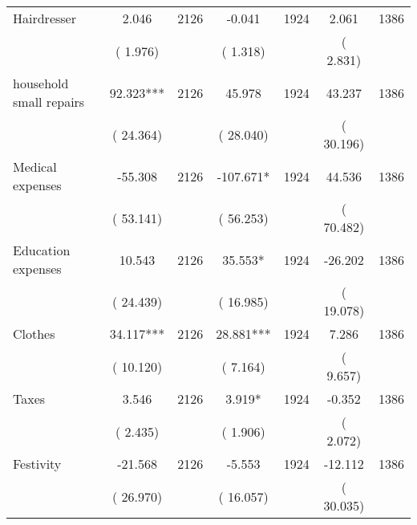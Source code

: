 \begin{tabular}{l*{6}{c}}
Hairdresser        &              2.046      &       2126       &             -0.041      &       1924       &              2.061      &       1386       \\
                       &       (       1.976)            &                               &       (       1.318)            &                               &       (       2.831)            &                               \\
household small repairs        &             92.323***      &       2126       &             45.978      &       1924       &             43.237      &       1386       \\
                       &       (      24.364)            &                               &       (      28.040)            &                               &       (      30.196)            &                               \\
Medical expenses        &            -55.308      &       2126       &           -107.671*      &       1924       &             44.536      &       1386       \\
                       &       (      53.141)            &                               &       (      56.253)            &                               &       (      70.482)            &                               \\
Education expenses        &             10.543      &       2126       &             35.553*      &       1924       &            -26.202      &       1386       \\
                       &       (      24.439)            &                               &       (      16.985)            &                               &       (      19.078)            &                               \\
Clothes        &             34.117***      &       2126       &             28.881***      &       1924       &              7.286      &       1386       \\
                       &       (      10.120)            &                               &       (       7.164)            &                               &       (       9.657)            &                               \\
Taxes        &              3.546      &       2126       &              3.919*      &       1924       &             -0.352      &       1386       \\
                       &       (       2.435)            &                               &       (       1.906)            &                               &       (       2.072)            &                               \\
Festivity        &            -21.568      &       2126       &             -5.553      &       1924       &            -12.112      &       1386       \\
                       &       (      26.970)            &                               &       (      16.057)            &                               &       (      30.035)            &                               \\
\hline \end{tabular}